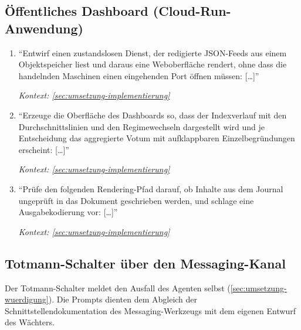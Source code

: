 \subsection{Öffentliches Dashboard (Cloud-Run-Anwendung)}
\label{sec:prompts-fable-dashboard}
\begin{enumerate}
    \item \enquote{Entwirf einen zustandslosen Dienst, der redigierte
            JSON-Feeds aus einem Objektspeicher liest und daraus eine
            Weboberfläche rendert, ohne dass die handelnden Maschinen einen
            eingehenden Port öffnen müssen: [\dots]}
            \par\hfill\textit{Kontext: \cref{sec:umsetzung-implementierung}}

    \item \enquote{Erzeuge die Oberfläche des Dashboards so, dass der
            Indexverlauf mit den Durchschnittslinien und den Regimewechseln
            dargestellt wird und je Entscheidung das aggregierte Votum mit
            aufklappbaren Einzelbegründungen erscheint: [\dots]}
            \par\hfill\textit{Kontext: \cref{sec:umsetzung-implementierung}}

    \item \enquote{Prüfe den folgenden Rendering-Pfad darauf, ob Inhalte aus
            dem Journal ungeprüft in das Dokument geschrieben werden, und
            schlage eine Ausgabekodierung vor: [\dots]}
            \par\hfill\textit{Kontext: \cref{sec:umsetzung-implementierung}}
\end{enumerate}

\subsection{Totmann-Schalter über den Messaging-Kanal}
\label{sec:prompts-fable-totmann}

Der Totmann-Schalter meldet den Ausfall des Agenten selbst
(\cref{sec:umsetzung-wuerdigung}). Die Prompts dienten dem Abgleich der
Schnittstellendokumentation des Messaging-Werkzeugs mit dem eigenen Entwurf
des Wächters.

